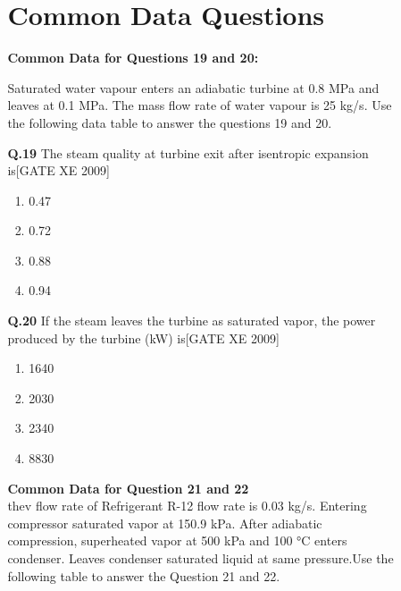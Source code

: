 \documentclass[journal,12pt,onecolumn]{IEEEtran}
\theoremstyle{remark}
\begin{document}
\begin{enumerate}
\begin{enumerate}
\begin{enumerate}
\vspace{0.3cm}
\section*{Common Data Questions}

\textbf{Common Data for Questions 19 and 20:}

Saturated water vapour enters an adiabatic turbine at 0.8 MPa and leaves at 0.1 MPa. The mass flow rate of water vapour is 25 kg/s. Use the following data table to answer the questions 19 and 20.





\item[\textbf{Q.19}]The steam quality at turbine exit after isentropic expansion is\hfill[GATE XE 2009]
\begin{multicols}{2}
\begin{enumerate}
    \item 0.47
    \item 0.72
    \item 0.88
    \item 0.94
\end{enumerate}
\end{multicols}

\vspace{0.3cm}

\item[\textbf{Q.20}] If the steam leaves the turbine as saturated vapor, the power produced by the turbine (kW) is\hfill[GATE XE 2009]
\begin{multicols}{2}
\begin{enumerate}
    \item 1640
    \item 2030
    \item 2340
    \item 8830
\end{enumerate}
\end{multicols}

\vspace{0.3cm}

\textbf{Common Data for Question 21 and 22}\\ thev flow rate of Refrigerant R-12 flow rate is 0.03 kg/s. Entering compressor saturated vapor at 150.9 kPa. After adiabatic compression, superheated vapor at 500 kPa and 100 °C enters condenser. Leaves condenser saturated liquid at same pressure.Use the following table to answer the Question 21 and 22.



\end{enumerate}
\end{enumerate}
\end{enumerate}
\end{document}
